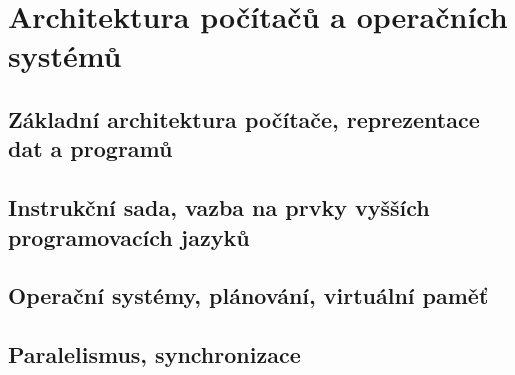 \documentclass[../../main.tex]{subfiles}
\begin{document}
\section{Architektura počítačů a operačních systémů}

\subsection{Základní architektura počítače, reprezentace dat a programů}
\subsection{Instrukční sada, vazba na prvky vyšších programovacích jazyků}
\subsection{Operační systémy, plánování, virtuální paměť}
\subsection{Paralelismus, synchronizace}
\end{document}
